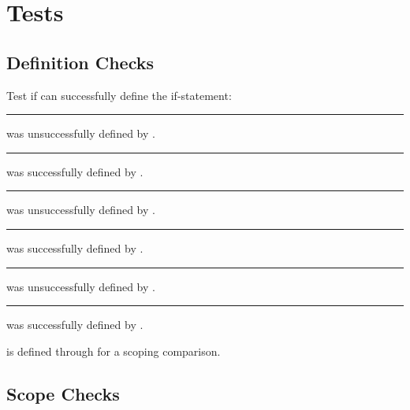 \chapter{ Tests}

\section{Definition Checks}


Test if  can successfully define the if-statement:\\
\ifx \ifTestIfa \UnDefined
    \rule{2em}{0pt} was unsuccessfully defined by .
\else
    \rule{2em}{0pt} was successfully defined by .
\fi\\
%
\ifx \TestIfatrue \UnDefined
    \rule{2em}{0pt} was unsuccessfully defined by .
\else
    \rule{2em}{0pt} was successfully defined by .
\fi\\
%
\ifx \TestIfafalse \UnDefined
    \rule{2em}{0pt} was unsuccessfully defined by .
\else
    \rule{2em}{0pt} was successfully defined by .
\fi


\newif\ifTestIfb
{} is defined through  for a scoping comparison.





\section{Scope Checks}
\TestIfatrue
\TestIfbtrue

